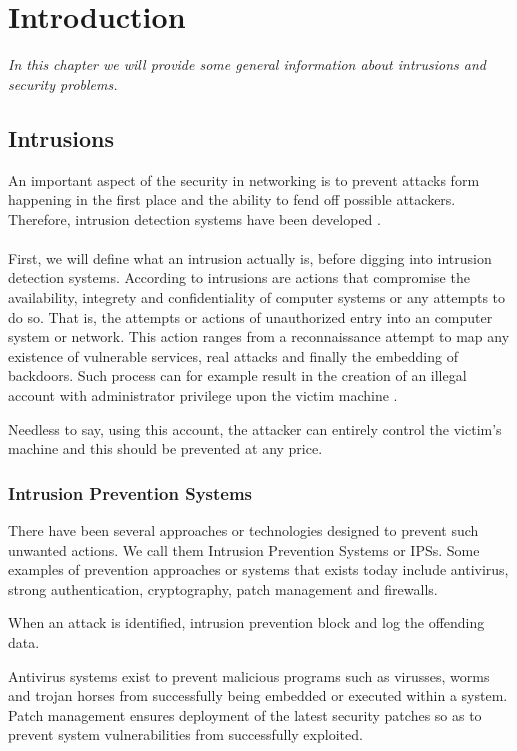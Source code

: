 \chapter{Introduction}
\emph{In this chapter we will provide some general information about intrusions and security problems.}
\minitoc

\section{Intrusions}

An important aspect of the security in networking is to prevent attacks form happening in the first place and the ability to fend off possible attackers. Therefore, intrusion detection systems have been developed \citep{IDS}. \\ \\
First, we will define what an intrusion actually is, before digging into intrusion detection systems. According to \citep{tr} intrusions are actions that compromise the availability, integrety and confidentiality of computer systems or any attempts to do so. That is,  the attempts or actions of unauthorized entry into an computer system or network. This action ranges from a reconnaissance attempt to map any existence of vulnerable services, real attacks and finally the embedding of backdoors. Such process can for example result in the creation of an illegal account with administrator privilege upon the victim machine \citep{76}. 

Needless to say, using this account, the attacker can entirely control the victim's machine and this should be prevented at any price.

\subsection{Intrusion Prevention Systems}

There have been several approaches or technologies designed to prevent such unwanted actions. We call them Intrusion Prevention Systems or IPSs. Some examples of prevention approaches or systems that exists today include antivirus, strong authentication, cryptography, patch management and firewalls.

When an attack is identified, intrusion prevention block and log the offending data.

Antivirus systems exist to prevent malicious programs such as virusses, worms and trojan horses from successfully being embedded or executed within a system. Patch management ensures deployment of the latest security patches so as to prevent system vulnerabilities from successfully exploited.

